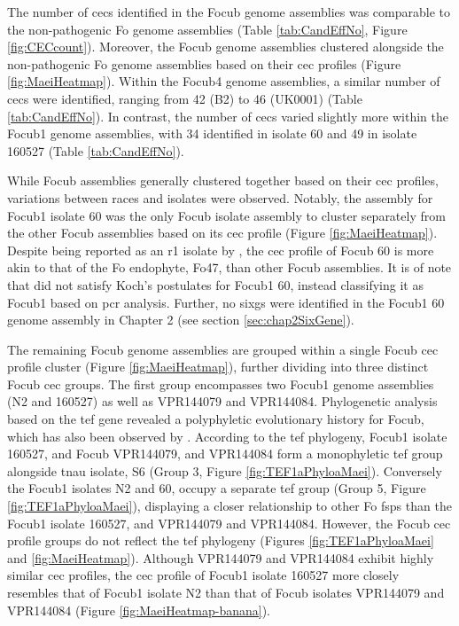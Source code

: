 The number of \acp{cec} identified in the \ac{Focub} genome assemblies was comparable to the non-pathogenic \ac{Fo} genome assemblies (Table \ref{tab:CandEffNo}, Figure \ref{fig:CECcount}). Moreover, the \ac{Focub} genome assemblies clustered alongside the non-pathogenic \ac{Fo} genome assemblies based on their \ac{cec} profiles (Figure \ref{fig:MaeiHeatmap}). Within the \ac{Focub4} genome assemblies, a similar number of \acp{cec} were identified, ranging from 42 (B2) to 46 (UK0001) (Table \ref{tab:CandEffNo}). In contrast, the number of \acp{cec} varied slightly more within the \ac{Focub1} genome assemblies, with 34 identified in isolate 60 and 49 in isolate 160527 (Table \ref{tab:CandEffNo}).

While \ac{Focub} assemblies generally clustered together based on their \ac{cec} profiles, variations between races and isolates were observed. Notably, the assembly for \ac{Focub1} isolate 60 was the only \ac{Focub} isolate assembly to cluster separately from the other \ac{Focub} assemblies based on its \ac{cec} profile (Figure \ref{fig:MaeiHeatmap}). Despite being reported as an \ac{r1} isolate by \textcite{Yun2019}, the \ac{cec} profile of \ac{Focub} 60 is more akin to that of the \ac{Fo} endophyte, Fo47, than other \ac{Focub} assemblies. It is of note that \textcite{Yun2019} did not satisfy Koch's postulates for \ac{Focub1} 60, instead classifying it as \ac{Focub1} based on \ac{pcr} analysis. Further, no \acp{sixg} were identified in the \ac{Focub1} 60 genome assembly in Chapter 2 (see section \ref{sec:chap2SixGene}). 

The remaining \ac{Focub} genome assemblies are grouped within a single \ac{Focub} \ac{cec} profile cluster (Figure \ref{fig:MaeiHeatmap}), further dividing into three distinct \ac{Focub} \ac{cec} groups. The first group encompasses two \ac{Focub1} genome assemblies (N2 and 160527) as well as VPR144079 and VPR144084. Phylogenetic analysis based on the \ac{tef} gene revealed a polyphyletic evolutionary history for \ac{Focub}, which has also been observed by \textcite{Odonnell1998, Groenewald2006, Fourie2009, Maryani2019, Mostert2022}. According to the \ac{tef} phylogeny, \ac{Focub1} isolate 160527, and \ac{Focub} VPR144079, and VPR144084 form a monophyletic \ac{tef} group alongside \ac{tnau} isolate, S6 (Group 3, Figure \ref{fig:TEF1aPhyloaMaei}). Conversely the \ac{Focub1} isolates N2 and 60, occupy a separate \ac{tef} group (Group 5, Figure \ref{fig:TEF1aPhyloaMaei}), displaying a closer relationship to other \ac{Fo} \acp{fsp} than the \ac{Focub1} isolate 160527, and VPR144079 and VPR144084. However, the \ac{Focub} \ac{cec} profile groups do not reflect the \ac{tef} phylogeny (Figures  \ref{fig:TEF1aPhyloaMaei} and \ref{fig:MaeiHeatmap}). Although VPR144079 and VPR144084 exhibit highly similar \ac{cec} profiles, the \ac{cec} profile of \ac{Focub1} isolate 160527 more closely resembles that of \ac{Focub1} isolate N2 than that of \ac{Focub} isolates VPR144079 and VPR144084 (Figure \ref{fig:MaeiHeatmap-banana}).

